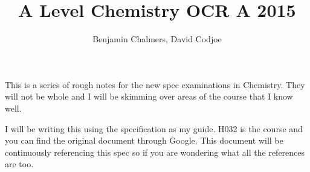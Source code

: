\documentclass[11pt,a4paper]{memoir}
\author{Benjamin Chalmers, David Codjoe}
\title{A Level Chemistry OCR A 2015}
\begin{document}
\frontmatter
\maketitle
\newpage
	This is a series of rough notes for the new spec examinations in Chemistry. They will not be whole and I will be skimming over areas of the course that I know well.
	
	I will be writing this using the specification as my guide. H032 is the course and you can find the original document through Google. This document will be continuously referencing this spec so if you are wondering what all the references are too.
\newpage
\tableofcontents
\mainmatter


	

	
%

%




\end{document}
